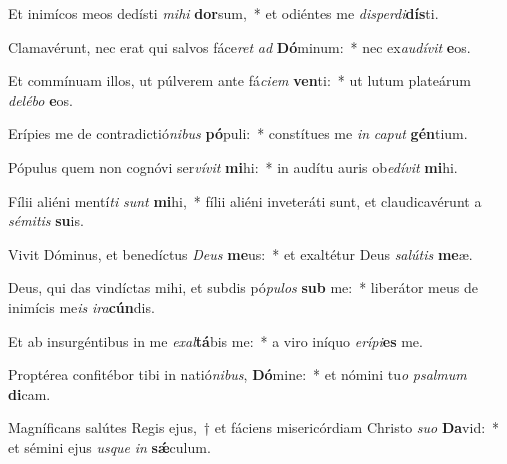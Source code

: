 \item Et inimícos meos dedísti \textit{mi}\textit{hi} \textbf{dor}sum,~* et odiéntes me \textit{dis}\textit{per}\textit{di}\textbf{dís}ti.
\item Clamavérunt, nec erat qui salvos fáce\textit{ret} \textit{ad} \textbf{Dó}minum:~* nec ex\textit{au}\textit{dí}\textit{vit} \textbf{e}os.
\item Et commínuam illos, ut púlverem ante fá\textit{ci}\textit{em} \textbf{ven}ti:~* ut lutum plateárum \textit{de}\textit{lé}\textit{bo} \textbf{e}os.
\item Erípies me de contradictió\textit{ni}\textit{bus} \textbf{pó}puli:~* constítues me \textit{in} \textit{ca}\textit{put} \textbf{gén}tium.
\item Pópulus quem non cognóvi ser\textit{ví}\textit{vit} \textbf{mi}hi:~* in audítu auris ob\textit{e}\textit{dí}\textit{vit} \textbf{mi}hi.
\item Fílii aliéni mentí\textit{ti} \textit{sunt} \textbf{mi}hi,~* fílii aliéni inveteráti sunt, et claudicavérunt a \textit{sé}\textit{mi}\textit{tis} \textbf{su}is.
\item Vivit Dóminus, et benedíctus \textit{De}\textit{us} \textbf{me}us:~* et exaltétur Deus \textit{sa}\textit{lú}\textit{tis} \textbf{me}æ.
\item Deus, qui das vindíctas mihi, et subdis pó\textit{pu}\textit{los} \textbf{sub} me:~* liberátor meus de inimícis me\textit{is} \textit{i}\textit{ra}\textbf{cún}dis.
\item Et ab insurgéntibus in me \textit{ex}\textit{al}\textbf{tá}bis me:~* a viro iníquo \textit{e}\textit{rí}\textit{pi}\textbf{es} me.
\item Proptérea confitébor tibi in natió\textit{ni}\textit{bus}, \textbf{Dó}mine:~* et nómini tu\textit{o} \textit{psal}\textit{mum} \textbf{di}cam.
\item Magníficans salútes Regis ejus,~† et fáciens misericórdiam Christo \textit{su}\textit{o} \textbf{Da}vid:~* et sémini ejus \textit{us}\textit{que} \textit{in} \textbf{sǽ}culum.
